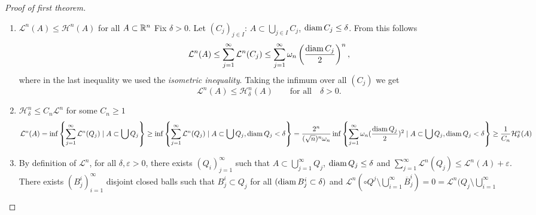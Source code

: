 \begin{proof}[Proof of first theorem]
\TODO
\begin{enumerate}[{Step} 2]
\item $\mathcal{L}^n(A) \leq \mathcal{H}^n(A)$ for all $A \subset \mathbb{R}^n$ 
Fix $\delta > 0$. Let $(C_j)_{j\in I}$: $A \subset \bigcup_{j\in I} C_j$, $\operatorname{diam}
C_j \leq \delta$. From this follows 
\[
\mathcal{L}^n(A) \leq \sum_{j=1}^\infty \mathcal{L}^n(C_j) \leq
\sum_{j=1}^\infty \omega_n \left(\frac{\operatorname{diam} C_j}{2}\right)^n,
\]
where in the last inequality we used the \emph{isometric inequality}. Taking the
infimum over all $(C_j)$ we get 
\[
\mathcal{L}^n(A) \leq \mathcal{H}^n_\delta (A) \qquad \text{for all} \quad
\delta > 0.
\]
\item $\mathcal{H}^n_{\delta} \leq C_n \mathcal{L}^n$ for some $C_n \geq 1$
\[
\mathcal{L}^n(A) 
= \inf\left\{ \sum_{j=1}^\infty \mathcal{L}^n(Q_j) \mid A
\subset \bigcup Q_j\right\}
\geq \inf\left\{ \sum_{j=1}^\infty \mathcal{L}^n(Q_j) \mid A
\subset \bigcup Q_j, \operatorname{diam} Q_j < \delta \right\}
= \frac{2^n}{(\sqrt{n})^n \omega_n} \inf
\left\{\sum_{j=1}^\infty \omega_n (\frac{\operatorname{diam} Q_j}{2})^2 \mid 
A \subset \bigcup Q_j, \operatorname{diam} Q_j < \delta\right\}
\geq \frac{1}{C_n} \mathcal{H}^n_\delta (A)
\]
\item By definition of $\mathcal{L}^n$, for all $\delta, \varepsilon > 0$, there
exists $(Q_i)_{j=1}^\infty$ such that $A \subset \bigcup_{j=1}^\infty Q_j$,
$\operatorname{diam} Q_j \leq \delta$ and $\sum_{j=1}^\infty \mathcal{L}^n(Q_j) \leq
\mathcal{L}^n(A) + \varepsilon$. There exists $(B_j^i)_{i=1}^\infty$ disjoint
closed balls such that $B_j^i \subset Q_j$ for all $(\operatorname{diam} B^i_j \subset
\delta)$ and $\mathcal{L}^n(\circ Q^j \setminus \bigcup_{i=1}^\infty
\overline{B}_j^i) = 0 = \mathcal{L}^n(Q_j \setminus \bigcup_{i=1}^\infty$
\end{enumerate}
\end{proof}

